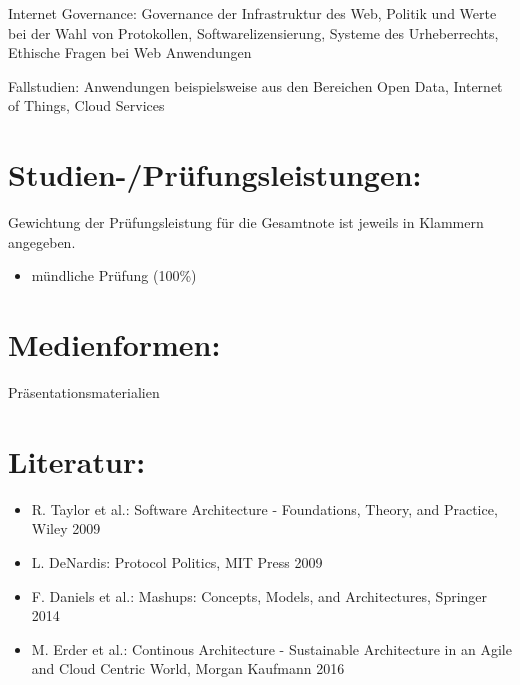 Internet Governance: Governance der Infrastruktur des Web, Politik und
Werte bei der Wahl von Protokollen, Softwarelizensierung, Systeme des
Urheberrechts, Ethische Fragen bei Web Anwendungen

Fallstudien: Anwendungen beispielsweise aus den Bereichen Open Data,
Internet of Things, Cloud Services

\section*{Studien-/Prüfungsleistungen:\label{/mi-2017/modulbeschreibungen-master/MA_WTW_Modul_Web-Architekturen}}\label{studien-pruxfcfungsleistungenpathlabelmi-2017modulbeschreibungen-mastermaux5fwtwux5fmodulux5fweb-architekturen}

Gewichtung der Prüfungsleistung für die Gesamtnote ist jeweils in
Klammern angegeben.

\begin{itemize}
\tightlist
\item
  mündliche Prüfung (100\%)
\end{itemize}

\section*{Medienformen:\label{/mi-2017/modulbeschreibungen-master/MA_WTW_Modul_Web-Architekturen}}\label{medienformenpathlabelmi-2017modulbeschreibungen-mastermaux5fwtwux5fmodulux5fweb-architekturen}

Präsentationsmaterialien

\section*{Literatur:\label{/mi-2017/modulbeschreibungen-master/MA_WTW_Modul_Web-Architekturen}}\label{literaturpathlabelmi-2017modulbeschreibungen-mastermaux5fwtwux5fmodulux5fweb-architekturen}

\begin{itemize}
\tightlist
\item
  R. Taylor et al.: Software Architecture - Foundations, Theory, and
  Practice, Wiley 2009
\item
  L. DeNardis: Protocol Politics, MIT Press 2009
\item
  F. Daniels et al.: Mashups: Concepts, Models, and Architectures,
  Springer 2014
\item
  M. Erder et al.: Continous Architecture - Sustainable Architecture in
  an Agile and Cloud Centric World, Morgan Kaufmann 2016
\end{itemize}

